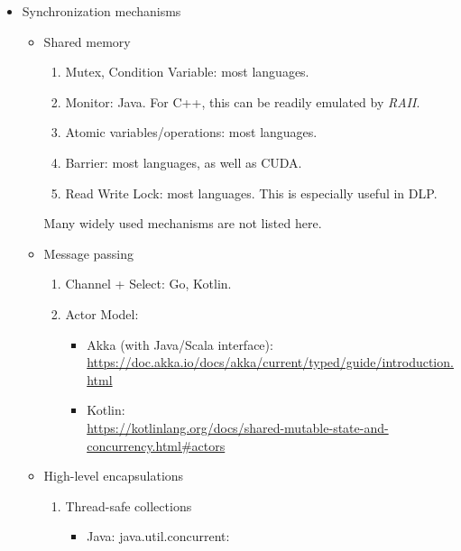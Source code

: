 \documentclass{article}
\begin{document}
\begin{itemize}
\begin{itemize}
        \item Synchronization mechanisms
        \begin{itemize}
            \item Shared memory
            \begin{enumerate}
                \item Mutex, Condition Variable: most languages.
                \item Monitor: Java.
                For C++, this can be readily emulated by \emph{RAII}.
                \item Atomic variables/operations: most languages.
                \item Barrier: most languages, as well as CUDA.
                \item Read Write Lock: most languages.
                This is especially useful in DLP.
            \end{enumerate}
            Many widely used mechanisms are not listed here.
            \item Message passing
            \begin{enumerate}
                \item Channel + Select: Go, Kotlin.
                \item Actor Model:
                    \begin{itemize}
                        \item Akka (with Java/Scala interface):\\ \href{https://doc.akka.io/docs/akka/current/typed/guide/introduction.html}{https://doc.akka.io/docs/akka/current/typed/guide/introduction.html}
                        \item Kotlin:\\
                        \href{https://kotlinlang.org/docs/shared-mutable-state-and-concurrency.html#actors}{https://kotlinlang.org/docs/shared-mutable-state-and-concurrency.html\#actors}
                    \end{itemize}
            \end{enumerate}
            \item High-level encapsulations
            \begin{enumerate}
                \item Thread-safe collections
                    \begin{itemize}
                    \item Java: java.util.concurrent:\\

\end{itemize}
\end{enumerate}
\end{itemize}
\end{itemize}
\end{itemize}
\end{document}
